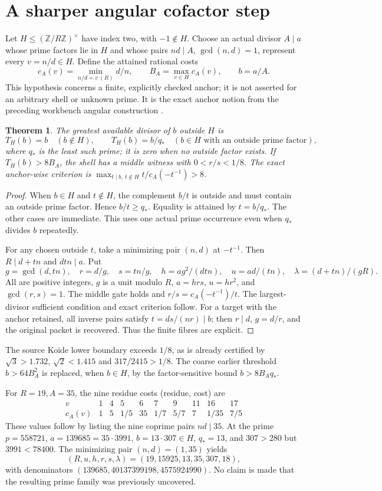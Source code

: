 \documentclass[11pt]{amsart}
\newtheorem{theorem}{Theorem}\newtheorem{proposition}[theorem]{Proposition}
\newcommand{\Z}{\mathbb Z}\newcommand{\Q}{\mathbb Q}
\begin{document}
\section{A sharper angular cofactor step}
Let $H\le(\Z/R\Z)^\times$ have index two, with $-1\notin H$.
Choose an actual divisor $A\mid a$ whose prime factors lie in $H$ and
whose pairs $nd\mid A$, $\gcd(n,d)=1$, represent every $v=n/d\in H$.
Define the attained rational costs
\[
 c_A(v)=\min_{n/d=v\ (R)}d/n,
 \qquad B_A=\max_{v\in H}c_A(v),\qquad b=a/A.
\]
This hypothesis concerns a finite, explicitly checked anchor; it is not
asserted for an arbitrary shell or unknown prime. It is the exact anchor
notion from the preceding workbench angular construction \cite{anchor}.

\begin{theorem}
The greatest available divisor of $b$ outside $H$ is
\[
 T_H(b)=b\quad(b\notin H),\qquad
 T_H(b)=b/q_*\quad(b\in H\text{ with an outside prime factor}),
\]
where $q_*$ is the least such prime; it is zero when no outside factor exists.
If $T_H(b)>8B_A$, the shell has a middle witness with $0<r/s<1/8$.
The exact anchor-wise criterion is
$\max_{t\mid b,\ t\notin H}t/c_A(-t^{-1})>8$.
\end{theorem}
\begin{proof}
When $b\in H$ and $t\notin H$, the complement $b/t$ is outside and must
contain an outside prime factor. Hence $b/t\ge q_*$. Equality is attained
by $t=b/q_*$. The other cases are immediate. This uses one actual prime
occurrence even when $q_*$ divides $b$ repeatedly.

For any chosen outside $t$, take a minimizing pair $(n,d)$ at $-t^{-1}$.
Then $R\mid d+tn$ and $dtn\mid a$. Put
\[
 g=\gcd(d,tn),\quad r=d/g,\quad s=tn/g,\quad
 h=ag^2/(dtn),\quad u=ad/(tn),\quad\lambda=(d+tn)/(gR).
\]
All are positive integers, $g$ is a unit modulo $R$, $a=hrs$, $u=hr^2$,
and $\gcd(r,s)=1$. The middle gate holds and $r/s=c_A(-t^{-1})/t$.
The largest-divisor sufficient condition and exact criterion follow.
For a target with the anchor retained, all inverse pairs satisfy
$t=ds/(nr)\mid b$; then $r\mid d$, $g=d/r$, and the original packet is
recovered. Thus the finite fibres are explicit.
\end{proof}
The source Koide lower boundary exceeds $1/8$, as is already certified by
$\sqrt3>1.732$, $\sqrt2<1.415$ and $317/2415>1/8$.
The coarse earlier threshold $b>64B_A^2$ is replaced, when $b\in H$,
by the factor-sensitive bound $b>8B_Aq_*$.

For $R=19,A=35$, the nine residue costs (residue, cost) are
\[
\begin{array}{c|rrrrrrrrr}
v&1&4&5&6&7&9&11&16&17\\\hline
c_A(v)&1&5&1/5&35&1/7&5/7&7&1/35&7/5
\end{array}
\]
These values follow by listing the nine coprime pairs $nd\mid35$.
At the prime $p=558721$, $a=139685=35\cdot3991$,
$b=13\cdot307\in H$, $q_*=13$, and $307>280$ but $3991<78400$.
The minimizing pair $(n,d)=(1,35)$ yields
\[
 (R,u,h,r,s,\lambda)=(19,15925,13,35,307,18),
\]
with denominators $(139685,40137399198,4575924990)$.
No claim is made that the resulting prime family was previously uncovered.
\end{document}
